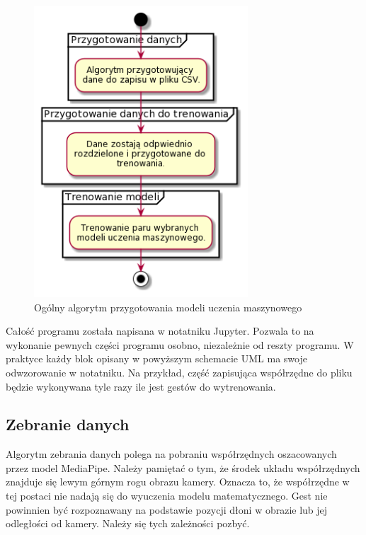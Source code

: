     \begin{figure}[H]
        \begin{center}
            \includegraphics[width=8cm]{../images/full_algorithm.png}
            \caption{Ogólny algorytm przygotowania modeli uczenia maszynowego}
        \end{center}
    \end{figure}

    \quad Całość programu została napisana w notatniku Jupyter. Pozwala to na wykonanie pewnych części programu osobno, niezależnie od reszty programu. W praktyce każdy blok opisany w powyższym schemacie UML ma swoje odwzorowanie w notatniku. Na przykład, część zapisująca współrzędne do pliku będzie wykonywana tyle razy ile jest gestów do wytrenowania. 

    \subsection{Zebranie danych}
    \quad Algorytm zebrania danych polega na pobraniu współrzędnych oszacowanych przez model MediaPipe. Należy pamiętać o tym, że środek układu współrzędnych znajduje się lewym górnym rogu obrazu kamery. Oznacza to, że współrzędne w tej postaci nie nadają się do wyuczenia modelu matematycznego. Gest nie powinnien być rozpoznawany na podstawie pozycji dłoni w obrazie lub jej odległości od kamery. Należy się tych zależności pozbyć. 
    
